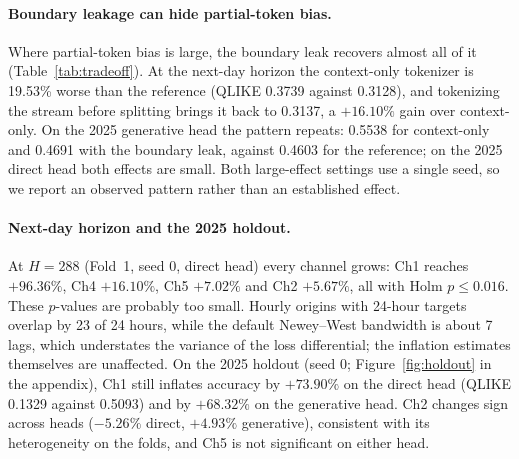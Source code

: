 \documentclass{article}
\begin{document}
\begin{table}[t]
  \caption{Token-boundary leakage versus partial-token bias (single seed). QLIKE of the hour-aligned
  reference, the unconstrained context-only tokenizer and the stream-then-split tokenizer.
  Partial-token bias compares context-only with the reference (Diebold--Mariano $p$); boundary
  leakage compares stream-then-split with context-only (Holm $p$).}
  \label{tab:tradeoff}
  \centering
  \small
  
\end{table}

\paragraph{Boundary leakage can hide partial-token bias.}
Where partial-token bias is large, the boundary leak recovers almost all of it
(Table~\ref{tab:tradeoff}). At the next-day horizon the context-only tokenizer is 19.53\% worse than
the reference (QLIKE 0.3739 against 0.3128), and tokenizing the stream before splitting brings it
back to 0.3137, a $+16.10\%$ gain over context-only. On the 2025 generative head the pattern
repeats: 0.5538 for context-only and 0.4691 with the boundary leak, against 0.4603 for the
reference; on the 2025 direct head both effects are small. Both large-effect settings use a single
seed, so we report an observed pattern rather than an established effect.

\paragraph{Next-day horizon and the 2025 holdout.}
At $H=288$ (Fold~1, seed 0, direct head) every channel grows: Ch1 reaches $+96.36\%$, Ch4
$+16.10\%$, Ch5 $+7.02\%$ and Ch2 $+5.67\%$, all with Holm $p \le 0.016$. These $p$-values are
probably too small. Hourly origins with 24-hour targets overlap by 23 of 24 hours, while the default
Newey--West bandwidth is about 7 lags, which understates the variance of the loss differential; the
inflation estimates themselves are unaffected. On the 2025 holdout (seed 0;
Figure~\ref{fig:holdout} in the appendix), Ch1 still inflates accuracy by $+73.90\%$ on the direct
head (QLIKE 0.1329 against 0.5093) and by $+68.32\%$ on the generative head. Ch2 changes sign across
heads ($-5.26\%$ direct, $+4.93\%$ generative), consistent with its heterogeneity on the folds, and
Ch5 is not significant on either head.
\end{document}
